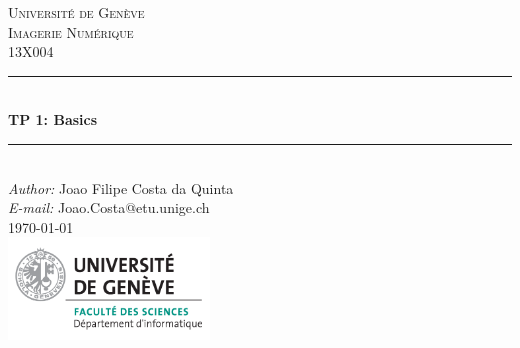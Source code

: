 \documentclass[a4paper]{article}
\makeatletter
\newcommand\TPid{1}
\newcommand\TPname{Basics}
\newcommand\Firstname{Joao Filipe}
\newcommand\Familyname{Costa da Quinta}
\newcommand\Email{Joao.Costa@etu.unige.ch}
\makeatother
\begin{document}
\begin{titlepage}

\newcommand{\HRule}{\rule{\linewidth}{0.5mm}} 							%
\newcommand\tab[1][1cm]{\hspace*{#1}}
\center 
 
\textsc{\LARGE Université de Genève}\\[1cm]

\textsc{\Large Imagerie Numérique}\\[0.2cm]
\textsc{\large 13X004}\\[1cm] 										%
\HRule \\[0.8cm]
{ \huge \bfseries TP \TPid : \TPname}\\[0.7cm]								%
\HRule \\[2cm]
\large
\emph{Author:} \Firstname \; \Familyname\\[0.5cm]		
\emph{E-mail:} {\color{blue}\Email}\\[7cm]		
{\large \today}\\[2cm]
\includegraphics[width=0.4\textwidth]{images/unige_csd.png}\\[1cm] 	%
\vfill 
\end{titlepage}


\end{document}
